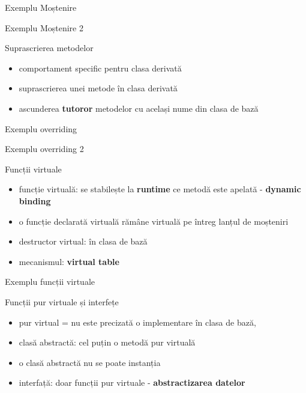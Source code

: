 \documentclass{beamer}
\begin{document}
\begin{frame}{Exemplu Moștenire}
  \footnotesize{}
\end{frame}   

\begin{frame}{Exemplu Moștenire 2}
  \footnotesize{}
\end{frame}

\begin{frame}{Suprascrierea metodelor}
  \begin{itemize}
    \item comportament specific pentru clasa derivată
  	\item suprascrierea unei metode în clasa derivată
	\item ascunderea \textbf{tutoror} metodelor cu același nume din clasa de bază  
  \end{itemize} 
\end{frame}

\begin{frame}{Exemplu overriding}
  \footnotesize{}
\end{frame}

\begin{frame}{Exemplu overriding 2}
  \footnotesize{}
\end{frame}

\begin{frame}{Funcții virtuale}
  \begin{itemize}
	\item funcție virtuală: se stabilește la \textbf{runtime} ce metodă este apelată - \textbf{dynamic binding}
	\item o funcție declarată virtuală rămâne virtuală pe întreg lanțul de moșteniri
	\item destructor virtual: în clasa de bază
	\item mecanismul: \textbf{virtual table}
  \end{itemize}
\end{frame}

\begin{frame}{Exemplu funcții virtuale}
  \footnotesize{}
\end{frame}

\begin{frame}{Funcții pur virtuale și interfețe}
  \begin{itemize}
    \item pur virtual = nu este precizată o implementare în clasa de bază,
	\item clasă abstractă: cel puțin o metodă pur virtuală
	\item o clasă abstractă nu se poate instanția 
	\item interfață: doar funcții pur virtuale - \textbf{abstractizarea datelor}
  \end{itemize}
\end{frame}
\end{document}
